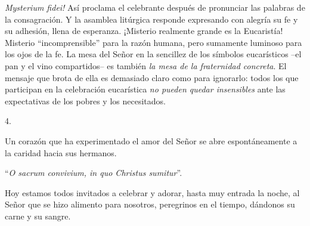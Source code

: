 			\begin{body}\textit{Mysterium fidei!} Así proclama el celebrante después de pronunciar las palabras de la consagración. Y la asamblea litúrgica responde expresando con alegría su fe y su adhesión, llena de esperanza. ¡Misterio realmente grande es la Eucaristía! Misterio “incomprensible” para la razón humana, pero sumamente luminoso para los ojos de la fe. La mesa del Señor en la sencillez de los símbolos eucarísticos –el pan y el vino compartidos– es también \textit{la mesa de la fraternidad concreta}. El mensaje que brota de ella es demasiado claro como para ignorarlo: todos los que participan en la celebración eucarística \textit{no pueden quedar insensibles} ante las expectativas de los pobres y los necesitados.\end{body}
			
			\begin{body}4. \begin{bodysmall}\end{bodysmall} Un corazón que ha experimentado el amor del Señor se abre espontáneamente a la caridad hacia sus hermanos.\end{body}
			
			\begin{body}“\textit{O sacrum convivium, in quo Christus sumitur}”.\end{body}
			
			\begin{body}Hoy estamos todos invitados a celebrar y adorar, hasta muy entrada la noche, al Señor que se hizo alimento para nosotros, peregrinos en el tiempo, dándonos su carne y su sangre.\end{body}
			

